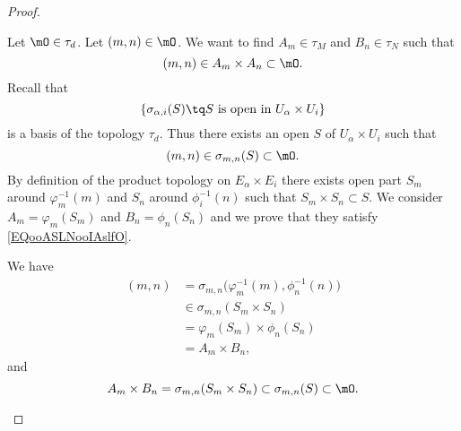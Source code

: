 \begin{proof}
\begin{subproof}
		Let \( \mO\in\tau_d\). Let \( (m,n)\in\mO\). We want to find \( A_m\in\tau_M\) and \( B_n\in \tau_N\) such that
		\begin{equation}		\label{EQooASLNooIAslfO}
			(m,n)\in A_m\times A_n\subset \mO.
		\end{equation}
		Recall that
		\begin{equation}
			\{ \sigma_{\alpha,i}(S)\tq S\text{ is open in }U_{\alpha}\times U_i \}
		\end{equation}
		is a basis of the topology \( \tau_d\). Thus there exists an open \( S\) of \( U_{\alpha}\times U_i\) such that
		\begin{equation}
			(m,n)\in\sigma_{m,n}(S)\subset \mO.
		\end{equation}
		By definition of the product topology on \( E_{\alpha}\times E_i\) there exists open part \( S_m\) around \( \varphi_m^{-1}(m)\) and \( S_n\) around \( \phi_i^{-1}(n)\) such that \( S_m\times S_n\subset S\). We consider \( A_m=\varphi_m(S_m)\) and \( B_n=\phi_n(S_n)\) and we prove that they satisfy \eqref{EQooASLNooIAslfO}.

		We have
		\begin{subequations}
			\begin{align}
				(m,n) & =\sigma_{m,n}\big( \varphi_m^{-1}(m), \phi_n^{-1}(n) \big) \\
				      & \in \sigma_{m,n}(S_m\times S_n)                            \\
				      & =\varphi_m(S_m)\times \phi_n(S_n)                          \\
				      & =A_m\times B_n,
			\end{align}
		\end{subequations}
		and
		\begin{equation}
			A_m\times B_n=\sigma_{m,n}(S_m\times S_n)\subset \sigma_{m,n}(S)\subset\mO.
		\end{equation}
	\end{subproof}
\end{proof}

